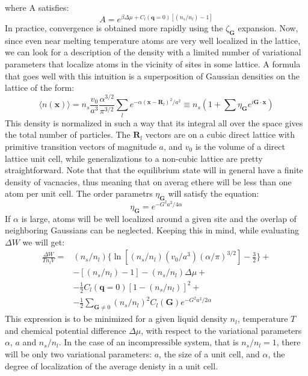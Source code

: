 \documentclass[12pt,a4paper]{article}
\begin{document}
where A satisfies:
\begin{equation}
A=e^{\beta \Delta \mu + C_l ( \textbf{q}=0 ) [(n_s/n_l)-1]}
\end{equation}
In practice, convergence is obtained more rapidly using the $\zeta_{\textbf{G}}$ expansion.
Now, since even near melting temperature atoms are very well localized in the lattice, we can look for a description of the density with a limited number of variational parameters that localize atoms in the vicinity of sites in some lattice.
A formula that goes well with this intuition is a superposition of Gaussian densities on the lattice of the form:
\begin{equation}
\langle n(\textbf{x})\rangle = 
n_s \frac{v_0}{a^3} \frac{\alpha^{3/2}}{\pi^{3/2}}
\sum_{l}e^{-\alpha(\textbf{x}-\textbf{R}_l)^2 /a^2} \equiv 
n_s ( 1 + \sum \eta_{\textbf{G}}e^{i \textbf{G} \cdot \textbf{x} } )
\end{equation}
This density is normalized in such a way that its integral all over the space gives the total number of particles. The $\textbf{R}_l$ vectors are on a cubic direct lattice with primitive transition vectors of magnitude $a$, and $v_0$ is the volume of a direct lattice unit cell, while generalizations to a non-cubic lattice are pretty straightforward.
Note that that the equilibrium state will in general have a finite density of vacnacies, thus meaning that on averag ethere will be less than one atom per unit cell. The order parametrs $\eta_{\textbf{G}}$ will satisfy the equation:
\begin{equation}
\eta_{\textbf{G}} = e^{-G^2 a^2 / 4 \alpha}
\end{equation}
If $\alpha$ is large, atoms will be well localized around a given site and the overlap of neighboring Gaussians can be neglected. Keeping this in mind, while evaluating $\Delta W$ we will get:
\begin{equation}
\begin{split}
\frac{\Delta W}{T n_l V} =&
(n_s/n_l) \bigg\{ \ln [(n_s/n_l)(v_0/a^3)(\alpha/\pi)^{3/2}]-\frac{3}{2}\bigg\}+ \\&
-[(n_s/n_l)-1]-(n_s/n_l)\Delta\mu + \\&
-\frac{1}{2}C_l(\textbf{q}=0)[1-(n_s/n_l)]^2 + \\&
-\frac{1}{2} \sum_{\textbf{G} \neq 0} (n_s/n_l)^2C_l(\textbf{G}) e^{ -G^2 a^2 / 2\alpha}
\end{split}
\end{equation}
This expression is to be minimized for a given liquid density $n_l$, temperature $T$ and chemical potential difference $\Delta \mu$, with respect to the variational parameters $\alpha$, $a$ and $n_s/n_l$. In the case of an incompressible system, that is $n_s/n_l = 1$, there will be only two variational parameters: $a$, the size of a unit cell, and $\alpha$, the degree of localization of the average denisty in a unit cell.
\end{document}
